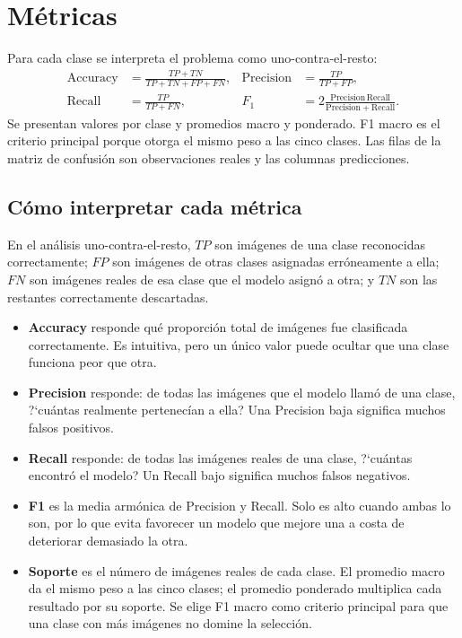 \documentclass[11pt,letterpaper]{article}
\begin{document}
\section{Métricas}
Para cada clase se interpreta el problema como uno-contra-el-resto:
\begin{align}
\mathrm{Accuracy}&=\frac{TP+TN}{TP+TN+FP+FN},&
\mathrm{Precision}&=\frac{TP}{TP+FP},\\
\mathrm{Recall}&=\frac{TP}{TP+FN},&
F_1&=2\frac{\mathrm{Precision}\,\mathrm{Recall}}
{\mathrm{Precision}+\mathrm{Recall}}.
\end{align}
Se presentan valores por clase y promedios macro y ponderado. F1 macro es el
criterio principal porque otorga el mismo peso a las cinco clases. Las filas de
la matriz de confusión son observaciones reales y las columnas predicciones.

\subsection{Cómo interpretar cada métrica}
En el análisis uno-contra-el-resto, $TP$ son imágenes de una clase reconocidas
correctamente; $FP$ son imágenes de otras clases asignadas erróneamente a ella;
$FN$ son imágenes reales de esa clase que el modelo asignó a otra; y $TN$ son
las restantes correctamente descartadas.

\begin{itemize}
\item \textbf{Accuracy} responde qué proporción total de imágenes fue
clasificada correctamente. Es intuitiva, pero un único valor puede ocultar que
una clase funciona peor que otra.
\item \textbf{Precision} responde: de todas las imágenes que el modelo llamó
de una clase, ?`cuántas realmente pertenecían a ella? Una Precision baja
significa muchos falsos positivos.
\item \textbf{Recall} responde: de todas las imágenes reales de una clase,
?`cuántas encontró el modelo? Un Recall bajo significa muchos falsos negativos.
\item \textbf{F1} es la media armónica de Precision y Recall. Solo es alto
cuando ambas lo son, por lo que evita favorecer un modelo que mejore una a
costa de deteriorar demasiado la otra.
\item \textbf{Soporte} es el número de imágenes reales de cada clase. El
promedio macro da el mismo peso a las cinco clases; el promedio ponderado
multiplica cada resultado por su soporte. Se elige F1 macro como criterio
principal para que una clase con más imágenes no domine la selección.
\end{itemize}
\end{document}
